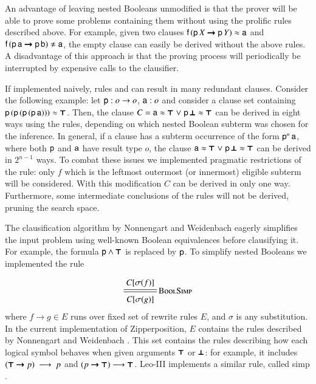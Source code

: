 An advantage of leaving nested Booleans unmodified is that the prover will be able
to prove some problems containing them without using the prolific rules described
above. For example, given two clauses $\mathsf{f} \, (\mathsf{p} \, X
\pmb{\rightarrow} \mathsf{p} \, Y) \approx \mathsf{a}$ and $\cst{f} \, (\cst{p} \,
\cst{a} \iimplies \cst{p} \, \cst{b}) \noteq \cst{a}$, the empty clause can
easily be derived without the above rules. A disadvantage of this approach
is that the proving process will periodically be interrupted by expensive calls
to the clausifier.
\pagebreak[2]

If implemented naively, rules  and  can result in many redundant clauses. Consider the following
example: let $\mathsf{p} : o \rightarrow o$, $\mathsf{a} : o$ and consider a clause
set containing $\mathsf{p} \, (\mathsf{p} \, (\mathsf{p} \, (\mathsf{p} \, \mathsf{a}))) \approx
\pmb{\top}$. Then, the clause $C = \mathsf{a} \approx \pmb{\top} \mathrel\lor \mathsf{p} \, \pmb{\bot} \approx \pmb{\top}$ can be
derived in eight ways using the rules, depending on which nested Boolean subterm was
chosen for the inference. In general, if a clause has a subterm occurrence of the form $\mathsf{p}^n \, \mathsf{a}$,
where both $\mathsf{p}$ and $\mathsf{a}$ have result type $o$, the clause $\mathsf{a} \approx \pmb{\top} \mathrel\lor \mathsf{p} \, \pmb{\bot} \approx \pmb{\top}$ can be derived in $2^{n-1}$ ways.
To combat these issues we
implemented pragmatic restrictions of the rule: only $f$ which is
the leftmost outermost (or innermost) eligible subterm will be considered. With
this modification $C$ can be derived in only one way. Furthermore,
some intermediate conclusions of the rules will not be derived, pruning the search space.


The clausification algorithm by Nonnengart and Weidenbach \cite{nw-01-small-cnf}
eagerly simplifies the input problem using well-known Boolean equivalences before clausifying it. For example,
the formula $\mathsf{p}\land\pmb{\top}$ is replaced by $\mathsf{p}$. To simplify nested Booleans we implemented the rule

\[
\namedsimp{BoolSimp}{C[\sigmaterm{f}]}{C[\sigmaterm{g}]}
\]
where $f \longrightarrow g \in E$ runs over fixed set of rewrite rules $E$,
and $\sigma$ is any substitution. In the current implementation of Zipperposition, $E$ contains the rules
described by Nonnengart and Weidenbach \cite[Sect.~3]{nw-01-small-cnf}. This set contains
the rules describing how each logical symbol behaves when given arguments $\pmb{\top}$ or $\pmb{\bot}$: for example, 
it includes $(\pmb{\top} \pmb{\rightarrow} p)~\longrightarrow~p $ and $(p \pmb{\rightarrow} \pmb{\top}) \longrightarrow \pmb{\top}$. %
Leo-III implements a similar rule, called \textsf{simp} \cite[Sect.~4.2.1.]{as-18-phd}.


